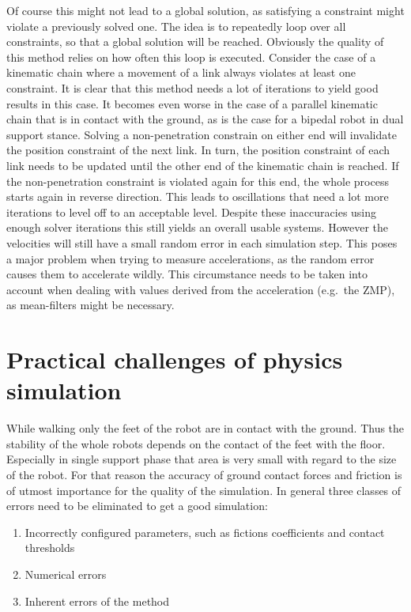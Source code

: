 \documentclass[english,ngerman]{KITreprt}
\begin{document}
Of course this might not lead to a global solution, as satisfying a
constraint might violate a previously solved one. The idea is to
repeatedly loop over all constraints, so that a global solution will be
reached. Obviously the quality of this method relies on how often this
loop is executed. Consider the case of a kinematic chain where a
movement of a link always violates at least one constraint. It is clear
that this method needs a lot of iterations to yield good results in this
case. It becomes even worse in the case of a parallel kinematic chain
that is in contact with the ground, as is the case for a bipedal robot
in dual support stance. Solving a non-penetration constrain on either
end will invalidate the position constraint of the next link. In turn,
the position constraint of each link needs to be updated until the other
end of the kinematic chain is reached. If the non-penetration constraint
is violated again for this end, the whole process starts again in
reverse direction. This leads to oscillations that need a lot more
iterations to level off to an acceptable level. Despite these
inaccuracies using enough solver iterations this still yields an overall
usable systems. However the velocities will still have a small random
error in each simulation step. This poses a major problem when trying to
measure accelerations, as the random error causes them to accelerate
wildly. This circumstance needs to be taken into account when dealing
with values derived from the acceleration (e.g.~the ZMP), as
mean-filters might be necessary.

\section{Practical challenges of physics
simulation}\label{practical-challenges-of-physics-simulation}

While walking only the feet of the robot are in contact with the ground.
Thus the stability of the whole robots depends on the contact of the
feet with the floor. Especially in single support phase that area is
very small with regard to the size of the robot. For that reason the
accuracy of ground contact forces and friction is of utmost importance
for the quality of the simulation. In general three classes of errors
need to be eliminated to get a good simulation:

\begin{enumerate}
\def\labelenumi{\arabic{enumi}.}
\item
  Incorrectly configured parameters, such as fictions coefficients and
  contact thresholds
\item
  Numerical errors
\item
  Inherent errors of the method
\end{enumerate}
\end{document}
